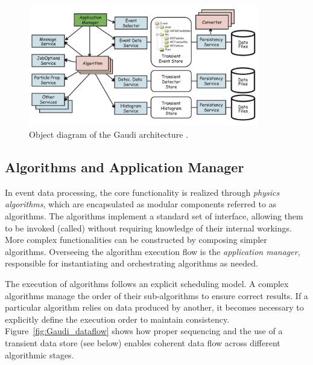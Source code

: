 \begin{figure}[htbp]
  \centering
  \includegraphics[width=0.9\textwidth]{figs/chapter3/Gaudi_object_diagram.png}
  \caption{Object diagram of the Gaudi architecture \cite{Gaudi}.}
  \label{fig:Gaudi_object_diagram}
\end{figure}

\subsection{Algorithms and Application Manager}
In event data processing, the core functionality is realized through \textit{physics algorithms}, which are encapsulated as modular components referred to as algorithms. The algorithms implement a standard set of interface, allowing them to be invoked (called) without requiring knowledge of their internal workings. More complex functionalities can be constructed by composing simpler algorithms. Overseeing the algorithm execution flow is the \textit{application manager}, responsible for instantiating and orchestrating algorithms as needed.

The execution of algorithms follows an explicit scheduling model. A complex algorithms manage the order of their sub-algorithms to ensure correct results. If a particular algorithm relies on data produced by another, it becomes necessary to explicitly define the execution order to maintain consistency. Figure~\ref{fig:Gaudi_dataflow} shows how proper sequencing and the use of a transient data store (see below) enables coherent data flow across different algorithmic stages.

